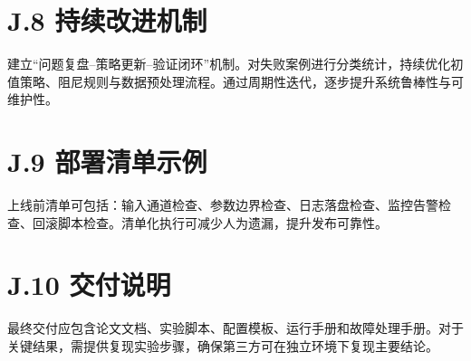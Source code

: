 \section*{J.8 持续改进机制}
建立“问题复盘--策略更新--验证闭环”机制。对失败案例进行分类统计，持续优化初值策略、阻尼规则与数据预处理流程。通过周期性迭代，逐步提升系统鲁棒性与可维护性。
\clearpage

\section*{J.9 部署清单示例}
上线前清单可包括：输入通道检查、参数边界检查、日志落盘检查、监控告警检查、回滚脚本检查。清单化执行可减少人为遗漏，提升发布可靠性。
\clearpage

\section*{J.10 交付说明}
最终交付应包含论文文档、实验脚本、配置模板、运行手册和故障处理手册。对于关键结果，需提供复现实验步骤，确保第三方可在独立环境下复现主要结论。
